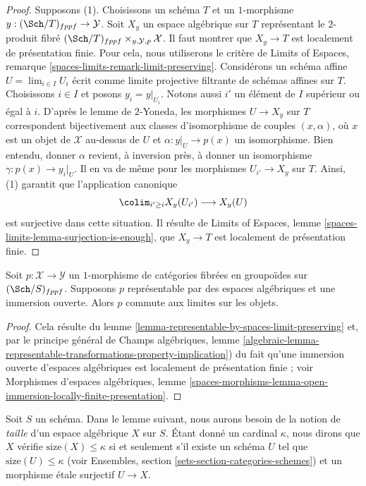 \begin{proof}
\medskip\noindent
Supposons (1). Choisissons un schéma $T$ et un $1$-morphisme
$y : (\Sch/T)_{fppf} \to \mathcal{Y}$. Soit
$X_y$ un espace algébrique sur $T$ représentant le $2$-produit fibré
$(\Sch/T)_{fppf} \times_{y, \mathcal{Y}, p} \mathcal{X}$.
Il faut montrer que $X_y \to T$ est localement de présentation finie.
Pour cela, nous utiliserons le critère de
Limits of Espaces, remarque \ref{spaces-limits-remark-limit-preserving}.
Considérons un schéma affine $U = \lim_{i \in I} U_i$ écrit comme
limite projective filtrante de schémas affines sur $T$.
Choisissons $i \in I$ et posons $y_i = y|_{U_i}$. Notons aussi $i'$ un élément
de $I$ supérieur ou égal à $i$. D'après le lemme de $2$-Yoneda, les
morphismes $U \to X_y$ sur $T$ correspondent bijectivement
aux classes d'isomorphisme de couples $(x, \alpha)$, où $x$ est un objet
de $\mathcal{X}$ au-dessus de $U$ et $\alpha : y|_U \to p(x)$ un isomorphisme.
Bien entendu, donner $\alpha$ revient, à inversion près, à donner
un isomorphisme $\gamma : p(x) \to y_i|_U$.
Il en va de même pour les morphismes $U_{i'} \to X_y$ sur $T$. Ainsi, (1) garantit
que l'application canonique
$$
\colim_{i' \geq i} X_y(U_{i'}) \longrightarrow X_y(U)
$$
est surjective dans cette situation. Il résulte de
Limits of Espaces, lemme \ref{spaces-limits-lemma-surjection-is-enough},
que $X_y \to T$ est localement de présentation finie.
\end{proof}

\begin{lemma}
\label{lemma-open-immersion-limit-preserving}
Soit $p : \mathcal{X} \to \mathcal{Y}$ un $1$-morphisme de catégories
fibrées en groupoïdes sur $(\Sch/S)_{fppf}$. Supposons $p$ représentable
par des espaces algébriques et une immersion ouverte. Alors $p$ commute aux
limites sur les objets.
\end{lemma}

\begin{proof}
Cela résulte du
lemme \ref{lemma-representable-by-spaces-limit-preserving}
et, par le principe général de
Champs algébriques, lemme
\ref{algebraic-lemma-representable-transformations-property-implication})
du fait qu'une immersion ouverte d'espaces algébriques est
localement de présentation finie ; voir
Morphismes d'espaces algébriques, lemme
\ref{spaces-morphisms-lemma-open-immersion-locally-finite-presentation}.
\end{proof}

\noindent
Soit $S$ un schéma. Dans le lemme suivant, nous aurons besoin de la notion de
{\it taille} d'un espace algébrique $X$ sur $S$. Étant donné un cardinal
$\kappa$, nous dirons que $X$ vérifie $\text{size}(X) \leq \kappa$ si et seulement
s'il existe un schéma $U$ tel que $\text{size}(U) \leq \kappa$ (voir
Ensembles, section \ref{sets-section-categories-schemes}) et un morphisme
étale surjectif $U \to X$.

